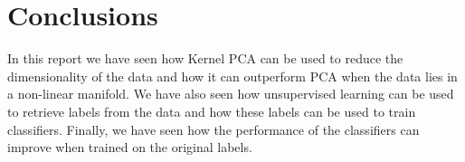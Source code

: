 
% 

\section{Conclusions}
In this report we have seen how Kernel PCA can be used to reduce the
dimensionality of the data and how it can outperform PCA when the data
lies in a non-linear manifold.
We have also seen how unsupervised learning can be used to retrieve
labels from the data and how these labels can be used to train classifiers.
Finally, we have seen how the performance of the classifiers can improve
when trained on the original labels.